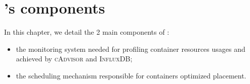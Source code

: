 
\chapter{\GP's components}
\label{chap:comp}

In this chapter, we detail the 2 main components of \GP{}:
\begin{itemize}
  \item the monitoring system needed for profiling container resources usages and achieved by \textsc{cAdvisor} and \textsc{InfluxDB};
  \item the scheduling mechanism responsible for containers optimized placement.
\end{itemize}



\newpage


